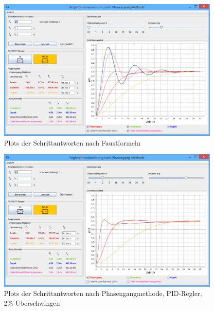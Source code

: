 \begin{figure}[h!, width=\pagewidth]
    \centering
    \includegraphics[width=\textwidth]{images/toolStartFaustFormeln.jpg}
    \caption{Plots der Schrittantworten nach Faustformeln}
    \label{fig:toolFaustFormeln}
\end{figure}

\begin{figure}[h!, width=\pagewidth]
    \centering
    \includegraphics[width=\textwidth]{images/tool2UeberschwingenOptimierungPID.jpg}
    \caption{Plots der Schrittantworten nach Phasengangmethode, PID-Regler, 2\% \"Uberschwingen}
    \label{fig:tool2UberschwingenPID}
\end{figure}

\clearpage
